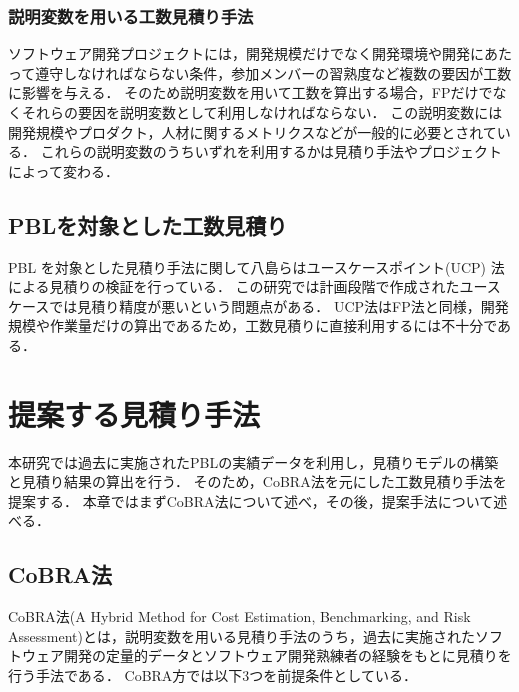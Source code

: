 \documentclass{compsoft}
\begin{document}
\subsubsection{説明変数を用いる工数見積り手法} \label{parametrix}
ソフトウェア開発プロジェクトには，開発規模だけでなく開発環境や開発にあたって遵守しなければならない条件，参加メンバーの習熟度など複数の要因が工数に影響を与える．
そのため説明変数を用いて工数を算出する場合，FPだけでなくそれらの要因を説明変数として利用しなければならない．
この説明変数には開発規模やプロダクト，人材に関するメトリクスなどが一般的に必要とされている\cite{ipa-web}．
これらの説明変数のうちいずれを利用するかは見積り手法やプロジェクトによって変わる．

\subsection{PBLを対象とした工数見積り} \label{PBL-estimation}
PBL を対象とした見積り手法に関して八島らはユースケースポイント(UCP) 法による見積りの検証を行っている\cite{yashima2011}．
この研究では計画段階で作成されたユースケースでは見積り精度が悪いという問題点がある．
UCP法はFP法と同様，開発規模や作業量だけの算出であるため，工数見積りに直接利用するには不十分である．

\section{提案する見積り手法} \label{Proposed-method}
本研究では過去に実施されたPBLの実績データを利用し，見積りモデルの構築と見積り結果の算出を行う．
そのため，CoBRA法を元にした工数見積り手法を提案する．
本章ではまずCoBRA法について述べ，その後，提案手法について述べる．

\subsection{CoBRA法} \label{CoBRA}
CoBRA法(A Hybrid Method for Cost Estimation, Benchmarking, and Risk Assessment)とは，説明変数を用いる見積り手法のうち，過去に実施されたソフトウェア開発の定量的データとソフトウェア開発熟練者の経験をもとに見積りを行う手法である\cite{CoBRA}．
CoBRA方では以下3つを前提条件としている．
\end{document}
